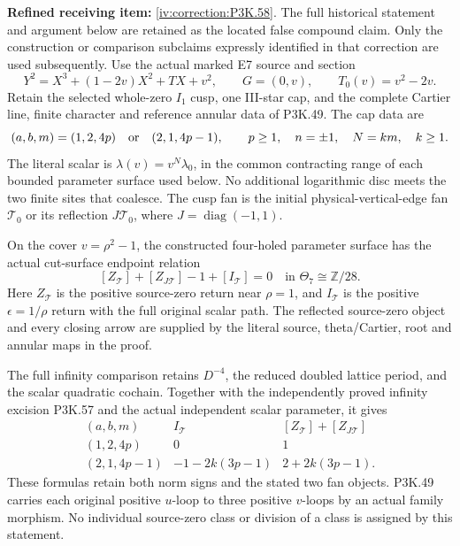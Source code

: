 \begin{theorem}\hypertarget{tag-02V4}{}\label{night:P3K.58}

\par\noindent\textbf{Refined receiving item:} \cref{iv:correction:P3K.58}. The full historical statement and argument below are retained as the located false compound claim. Only the construction or comparison subclaims expressly identified in that correction are used subsequently.
Use the actual marked E7 source and section
\[
 Y^2=X^3+(1-2v)X^2+TX+v^2,\qquad
 G=(0,v),\qquad T_0(v)=v^2-2v.
\]
Retain the selected whole-zero \(I_1\) cusp, one III-star cap,
and the complete Cartier line, finite character and reference
annular data of P3K.49. The cap data are
\[
 (a,b,m)=(1,2,4p)\quad\hbox{or}\quad(2,1,4p-1),
 \qquad p\ge1,\quad n=\pm1,\quad
 N=km,\quad k\ge1.
\]
The literal scalar is \(\lambda(v)=v^N\lambda_0\), in the
common contracting range of each bounded parameter surface
used below. No additional logarithmic disc meets the two
finite sites that coalesce. The cusp fan is the initial
physical-vertical-edge fan \(\mathcal T_0\) or its reflection
\(J\mathcal T_0\), where \(J=\operatorname{diag}(-1,1)\).

On the cover \(v=\rho^2-1\), the constructed four-holed
parameter surface has the actual cut-surface endpoint relation
\[
 [Z_{\mathcal T}]+[Z_{J\mathcal T}]-1+[I_{\mathcal T}]=0
                    \quad\text{in }\Theta_7\cong\mathbb Z/28.
\]
Here \(Z_{\mathcal T}\) is the positive source-zero return
near \(\rho=1\), and \(I_{\mathcal T}\) is the positive
\(\epsilon=1/\rho\) return with the full original scalar
path. The reflected source-zero object and every closing
arrow are supplied by the literal source, theta/Cartier,
root and annular maps in the proof.

The full infinity comparison retains \(D^{-4}\), the reduced
doubled lattice period, and the scalar quadratic cochain.
Together with the independently proved infinity excision
P3K.57 and the actual independent scalar parameter, it gives
\[
 \begin{array}{c|c|c}
 (a,b,m)&I_{\mathcal T}
                &[Z_{\mathcal T}]+[Z_{J\mathcal T}]\\ \hline
 (1,2,4p)&0&1\\
 (2,1,4p-1)&-1-2k(3p-1)&2+2k(3p-1).
 \end{array}
\]
These formulas retain both norm signs and the stated two
fan objects. P3K.49 carries each original positive \(u\)-loop
to three positive \(v\)-loops by an actual family morphism.
No individual source-zero class or division of a class is
assigned by this statement.
\end{theorem}

